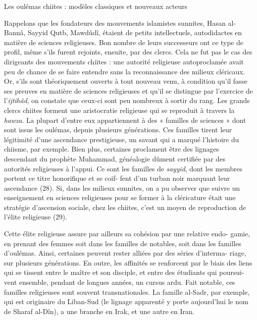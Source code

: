 Les oulémas chiites : modèles classiques et nouveaux acteurs

Rappelons que les fondateurs des mouvements islamistes sunnites, Hasan
al-Bannâ, Sayyid Qutb, Mawdûdî, étaient de petits intellectuels,
autodidactes en matière de sciences religieuses. Bon nombre de leurs
successeurs ont ce type de profil, même s'ils furent rejoints, ensuite,
par des clercs. Cela ne fut pas le cas des dirigeants des mouvements
chiites : une autorité religieuse autoproclamée avait peu de chance de
se faire entendre sans la reconnaissance des milieux cléricaux. Or,
s'ils sont théoriquement ouverts à tout nouveau venu, à condition qu'il
fasse ses preuves en matière de sciences religieuses et qu'il se
distingue par l'exercice de l'\emph{ijtihâd}, on constate que ceux-ci
sont peu nombreux à sortir du rang. Les grands clercs chiites forment
une aristocratie religieuse qui se reproduit à travers la \emph{hawza}.
La plupart d'entre eux appartiennent à des « familles de sciences » dont
sont issus les oulémas, depuis plusieurs générations. Ces familles
tirent leur légitimité d'une ascendance prestigieuse, un savant qui a
marqué l'histoire du chiisme, par exemple. Bien plus, certaines
proclament être des lignages descendant du prophète Muhammad, généalogie
dûment certifiée par des autorités religieuses à l'appui. Ce sont les
familles de \emph{sayyid}, dont les membres portent ce titre honorifique
et se coif- fent d'un turban noir marquant leur ascendance (28). Si,
dans les milieux sunnites, on a pu observer que suivre un enseignement
en sciences religieuses pour se former à la cléricature était une
stratégie d'ascension sociale, chez les chiites, c'est un moyen de
reproduction de l'élite religieuse (29).

Cette élite religieuse assure par ailleurs sa cohésion par une relative
endo- gamie, en prenant des femmes soit dans les familles de notables,
soit dans les familles d'oulémas. Ainsi, certaines peuvent rester
alliées par des séries d'interma- riage, sur plusieurs générations. En
outre, les affinités se renforcent par le biais des liens qui se tissent
entre le maître et son disciple, et entre des étudiants qui poursui-
vent ensemble, pendant de longues années, un cursus ardu. Fait notable,
ces familles religieuses sont souvent transnationales. La famille
al-Sadr, par exemple, qui est originaire du Liban-Sud (le lignage
apparenté y porte aujourd'hui le nom de Sharaf al-Dîn), a une branche en
Irak, et une autre en Iran.

